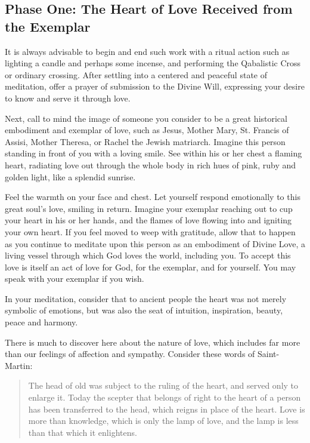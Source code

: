 \subsection*{Phase One: The Heart of Love Received from the Exemplar}

It is always advisable to begin and end such work with a ritual action such as lighting a
candle and perhaps some incense, and performing the Qabalistic Cross or ordinary
crossing. After settling into a centered and peaceful state of meditation, offer a prayer of
submission to the Divine Will, expressing your desire to know and serve it through love.

Next, call to mind the image of someone you consider to be a great historical
embodiment and exemplar of love, such as Jesus, Mother Mary, St. Francis of Assisi,
Mother Theresa, or Rachel the Jewish matriarch. Imagine this person standing in front of
you with a loving smile. See within his or her chest a flaming heart, radiating love out
through the whole body in rich hues of pink, ruby and golden light, like a splendid
sunrise.

Feel the warmth on your face and chest. Let yourself respond emotionally to this great
soul’s love, smiling in return. Imagine your exemplar reaching out to cup your heart in
his or her hands, and the flames of love flowing into and igniting your own heart. If you
feel moved to weep with gratitude, allow that to happen as you continue to meditate upon
this person as an embodiment of Divine Love, a living vessel through which God loves
the world, including you. To accept this love is itself an act of love for God, for the
exemplar, and for yourself. You may speak with your exemplar if you wish.

In your meditation, consider that to ancient people the heart was not merely symbolic of
emotions, but was also the seat of intuition, inspiration, beauty, peace and harmony. 

There is much to discover here about the nature of love, which includes far more than our
feelings of affection and sympathy. Consider these words of Saint-Martin:

\begin{quote}
	The head of old was subject to the ruling of the heart, and served only to enlarge
	it. Today the scepter that belongs of right to the heart of a person has been
	transferred to the head, which reigns in place of the heart. Love is more than
	knowledge, which is only the lamp of love, and the lamp is less than that which it
	enlightens.
\end{quote}

